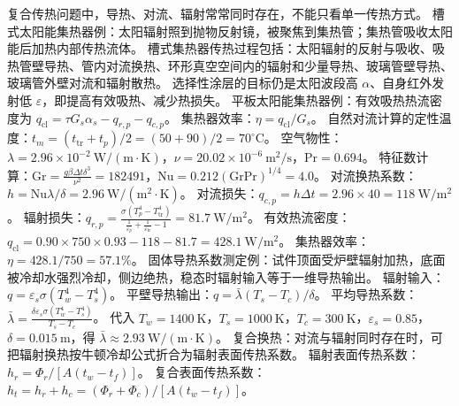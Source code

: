 复合传热问题中，导热、对流、辐射常常同时存在，不能只看单一传热方式。
槽式太阳能集热器例：太阳辐射照到抛物反射镜，被聚焦到集热管；集热管吸收太阳能后加热内部传热流体。
槽式集热器传热过程包括：太阳辐射的反射与吸收、吸热管壁导热、管内对流换热、环形真空空间内的辐射和少量导热、玻璃管壁导热、玻璃管外壁对流和辐射散热。
选择性涂层的目标仍是太阳波段高 $\alpha$、自身红外发射低 $\varepsilon$，即提高有效吸热、减少热损失。
平板太阳能集热器例：有效吸热热流密度为 $q_{\mathrm{cl}}=\tau G_s\alpha_s-q_{r,p}-q_{c,p}$。
集热器效率：$\eta=q_{\mathrm{cl}}/G_s$。
自然对流计算的定性温度：$t_m=(t_{\mathrm{tr}}+t_p)/2=(50+90)/2=70^\circ\mathrm{C}$。
空气物性：$\lambda=2.96\times10^{-2}\ \mathrm{W}/(\mathrm{m}\cdot\mathrm{K})$，$\nu=20.02\times10^{-6}\ \mathrm{m}^2/\mathrm{s}$，$\mathrm{Pr}=0.694$。
特征数计算：$\mathrm{Gr}=\frac{g\beta\Delta t\delta^3}{\nu^2}=182491$，$\mathrm{Nu}=0.212(\mathrm{Gr}\mathrm{Pr})^{1/4}=4.0$。
对流换热系数：$h=\mathrm{Nu}\lambda/\delta=2.96\ \mathrm{W}/(\mathrm{m}^2\cdot\mathrm{K})$。
对流损失：$q_{c,p}=h\Delta t=2.96\times40=118\ \mathrm{W}/\mathrm{m}^2$。
辐射损失：$q_{r,p}=\frac{\sigma(T_p^4-T_{\mathrm{tr}}^4)}{\frac{1}{\varepsilon_p}+\frac{1}{\varepsilon_{\mathrm{tr}}}-1}=81.7\ \mathrm{W}/\mathrm{m}^2$。
有效热流密度：$q_{\mathrm{cl}}=0.90\times750\times0.93-118-81.7=428.1\ \mathrm{W}/\mathrm{m}^2$。
集热器效率：$\eta=428.1/750=57.1\%$。
固体导热系数测定例：试件顶面受炉壁辐射加热，底面被冷却水强烈冷却，侧边绝热，稳态时辐射输入等于一维导热输出。
辐射输入：$q=\varepsilon_s\sigma(T_w^4-T_s^4)$。
平壁导热输出：$q=\bar{\lambda}(T_s-T_c)/\delta$。
平均导热系数：$\bar{\lambda}=\frac{\delta\varepsilon_s\sigma(T_w^4-T_s^4)}{T_s-T_c}$。
代入 $T_w=1400\ \mathrm{K}$，$T_s=1000\ \mathrm{K}$，$T_c=300\ \mathrm{K}$，$\varepsilon_s=0.85$，$\delta=0.015\ \mathrm{m}$，得 $\bar{\lambda}\approx2.93\ \mathrm{W}/(\mathrm{m}\cdot\mathrm{K})$。
复合换热：对流与辐射同时存在时，可把辐射换热按牛顿冷却公式折合为辐射表面传热系数。
辐射表面传热系数：$h_r=\Phi_r/[A(t_w-t_f)]$。
复合表面传热系数：$h_t=h_r+h_c=(\Phi_r+\Phi_c)/[A(t_w-t_f)]$。
